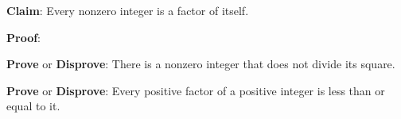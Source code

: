 
{\bf Claim}: Every nonzero integer is a factor of itself.

{\bf Proof}: 


\vfill

{\bf Prove} or {\bf Disprove}: There is a nonzero integer that does not divide its square.



\vfill

{\bf Prove} or {\bf Disprove}: Every positive factor of a positive integer is less than or equal to it.

\vfill